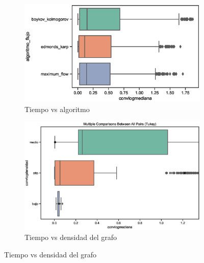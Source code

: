 \documentclass{article}
\begin{document}
\begin{figure}[htbp]

\begin{subfigure}{0.5\textwidth}
\includegraphics[width=0.9\linewidth]{Imagenes/aboxplotalgoritmoflujo.eps} 
\caption{Tiempo vs algoritmo}
\end{subfigure}

\begin{subfigure}{0.5\textwidth}
\includegraphics[width=0.9\linewidth]{Imagenes/aboxplotconvlogdensidad.eps}
\caption{Tiempo vs densidad del grafo}
\end{subfigure}


\end{figure}
\end{document}
